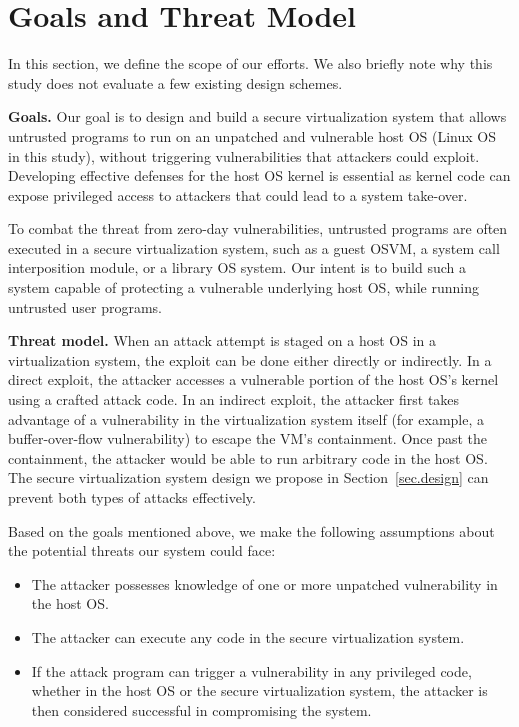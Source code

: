 \section{Goals and Threat Model}
\label{sec.motivation-and-background}

In this section, we define the scope of our efforts. We also briefly note why
this study does not evaluate a few existing design schemes.

\noindent
\textbf{Goals.}
Our goal is to design and build a secure virtualization system that allows
untrusted programs to run on an unpatched and vulnerable host OS (Linux OS in
this study), without triggering vulnerabilities that attackers could exploit.
Developing effective defenses for the host OS kernel is essential as kernel code
can expose privileged access to attackers that could lead to a system take-over.

To combat the threat from zero-day vulnerabilities, untrusted programs are often executed in a
secure virtualization system, such as a guest OSVM, a system call
interposition module, or a library OS system. Our intent is to
build such a system capable of protecting a vulnerable underlying host OS,
while running untrusted user programs.


\noindent
\textbf{Threat model.}
When an attack attempt is staged
on a host OS in a virtualization system,
the exploit can be done either directly or indirectly.
In a direct exploit, the attacker accesses a vulnerable portion of the host OS's kernel
using a crafted attack code. In an indirect exploit,
the attacker first takes advantage of a vulnerability in the virtualization system itself
(for example, a buffer-over-flow vulnerability)
to escape the VM's containment. Once past the containment, the attacker would be able to run arbitrary code
in the host OS.
The secure virtualization system design we propose
in Section~\ref{sec.design} can prevent both types of attacks effectively.

Based on the goals mentioned above, we make the following assumptions about the
potential threats our system could face:

\begin{itemize}\setlength\itemsep{0em}

\item The attacker possesses knowledge of one or more unpatched
vulnerability in the host OS.

\item The attacker can execute any code in the secure
virtualization system.

\item If the attack program can trigger a vulnerability in any privileged
code, whether in the host OS or the secure virtualization system, the attacker
is then considered successful in compromising the system.

\end{itemize}


